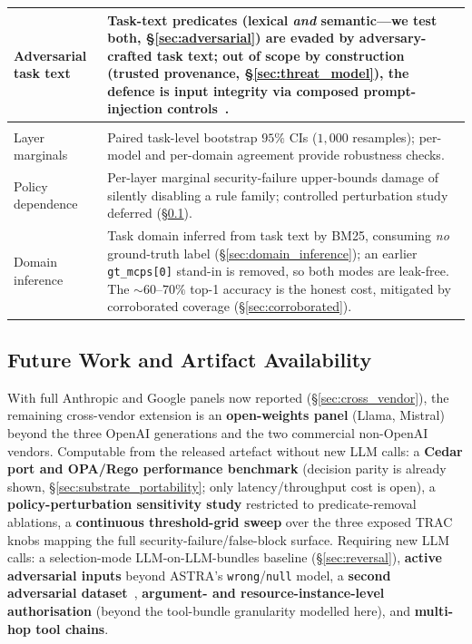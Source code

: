 \documentclass[sigconf,review,anonymous]{acmart}
\begin{document}
\begin{table}[!t]
\begin{tabularx}{\columnwidth}{@{}>{\raggedright\arraybackslash}p{1.8cm}>{\raggedright\arraybackslash}X@{}}
Adversarial task text & Task-text predicates (lexical \emph{and} semantic---we test both, \S\ref{sec:adversarial}) are evaded by adversary-crafted task text; out of scope by construction (trusted provenance, \S\ref{sec:threat_model}), the defence is input integrity via composed prompt-injection controls~\cite{liu2024formalizing}. \\
\midrule
\multicolumn{2}{@{}l}{\textit{Statistical}} \\
Layer marginals & Paired task-level bootstrap $95\%$ CIs ($1{,}000$ resamples); per-model and per-domain agreement provide robustness checks. \\
Policy dependence & Per-layer marginal security-failure upper-bounds damage of silently disabling a rule family; controlled perturbation study deferred (\S\ref{sec:future_work}). \\
Domain inference & Task domain inferred from task text by BM25, consuming \emph{no} ground-truth label (\S\ref{sec:domain_inference}); an earlier \texttt{gt\_mcps[0]} stand-in is removed, so both modes are leak-free. The $\sim\!60$--$70\%$ top-1 accuracy is the honest cost, mitigated by corroborated coverage (\S\ref{sec:corroborated}). \\
\bottomrule
\end{tabularx}
\end{table}

\subsection{Future Work and Artifact Availability}
\label{sec:future_work}
\label{sec:artifacts}

With full Anthropic and Google panels now reported (\S\ref{sec:cross_vendor}), the remaining cross-vendor extension is an \textbf{open-weights panel} (Llama, Mistral) beyond the three OpenAI generations and the two commercial non-OpenAI vendors. Computable from the released artefact without new LLM calls: a \textbf{Cedar port and OPA/Rego performance benchmark} (decision parity is already shown, \S\ref{sec:substrate_portability}; only latency/throughput cost is open), a \textbf{policy-perturbation sensitivity study} restricted to predicate-removal ablations, a \textbf{continuous threshold-grid sweep} over the three exposed TRAC knobs mapping the full security-failure/false-block surface. Requiring new LLM calls: a selection-mode LLM-on-LLM-bundles baseline (\S\ref{sec:reversal}), \textbf{active adversarial inputs} beyond ASTRA's \texttt{wrong}/\texttt{null} model, a \textbf{second adversarial dataset}~\cite{zhan2024injecagent,debenedetti2024agentdojo,ruan2024toolemu}, \textbf{argument- and resource-instance-level authorisation} (beyond the tool-bundle granularity modelled here), and \textbf{multi-hop tool chains}.
\end{document}
